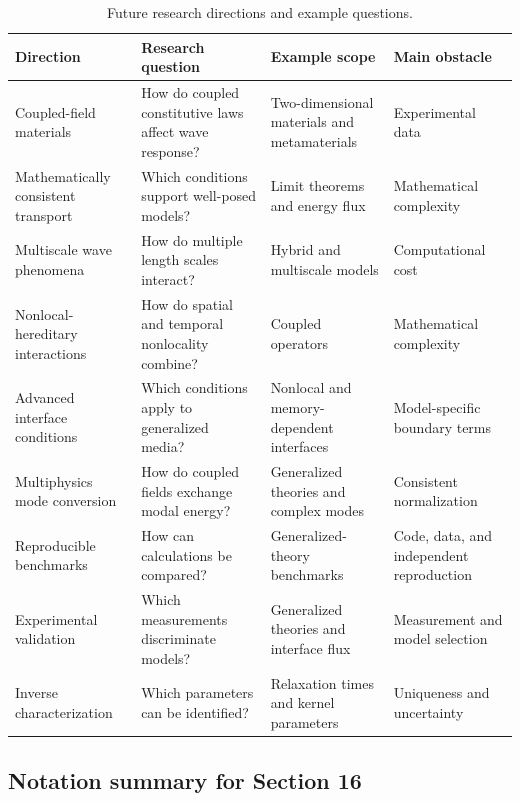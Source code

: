 \begin{table}[htbp]
\centering
\small
\caption{Future research directions and example questions.}
\label{tab:future_summary}
\begin{tabularx}{\textwidth}{@{}p{2.4cm}XXX@{}}
\toprule
\textbf{Direction} & \textbf{Research question} & \textbf{Example scope} & \textbf{Main obstacle} \\
\midrule
Coupled-field materials & How do coupled constitutive laws affect wave response? & Two-dimensional materials and metamaterials & Experimental data \\
Mathematically consistent transport & Which conditions support well-posed models? & Limit theorems and energy flux & Mathematical complexity \\
Multiscale wave phenomena & How do multiple length scales interact? & Hybrid and multiscale models & Computational cost \\
Nonlocal-hereditary interactions & How do spatial and temporal nonlocality combine? & Coupled operators & Mathematical complexity \\
Advanced interface conditions & Which conditions apply to generalized media? & Nonlocal and memory-dependent interfaces & Model-specific boundary terms \\
Multiphysics mode conversion & How do coupled fields exchange modal energy? & Generalized theories and complex modes & Consistent normalization \\
Reproducible benchmarks & How can calculations be compared? & Generalized-theory benchmarks & Code, data, and independent reproduction \\
Experimental validation & Which measurements discriminate models? & Generalized theories and interface flux & Measurement and model selection \\
Inverse characterization & Which parameters can be identified? & Relaxation times and kernel parameters & Uniqueness and uncertainty \\
\bottomrule
\end{tabularx}
\end{table}

\subsection{Notation summary for Section 16}

